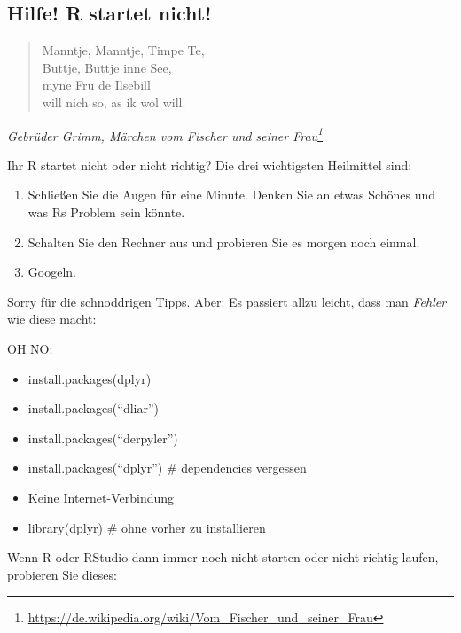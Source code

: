 \documentclass[12pt,ngerman,]{book}
\providecommand{\tightlist}{%
  \setlength{\itemsep}{0pt}\setlength{\parskip}{0pt}}
\let\rmarkdownfootnote\footnote%
\def\footnote{\protect\rmarkdownfootnote}
\theoremstyle{definition}
\theoremstyle{definition}
\theoremstyle{remark}
\let\BeginKnitrBlock\begin \let\EndKnitrBlock\end
\begin{document}
\subsection{Hilfe! R startet nicht!}\label{hilfe-r-startet-nicht}

\begin{quote}
Manntje, Manntje, Timpe Te,\\
Buttje, Buttje inne See,\\
myne Fru de Ilsebill\\
will nich so, as ik wol will.
\end{quote}

\emph{Gebrüder Grimm, Märchen vom Fischer und seiner Frau\footnote{\url{https://de.wikipedia.org/wiki/Vom_Fischer_und_seiner_Frau}}}

Ihr R startet nicht oder nicht richtig? Die drei wichtigsten Heilmittel
sind:

\begin{enumerate}
\def\labelenumi{\arabic{enumi}.}
\tightlist
\item
  Schließen Sie die Augen für eine Minute. Denken Sie an etwas Schönes
  und was Rs Problem sein könnte.
\item
  Schalten Sie den Rechner aus und probieren Sie es morgen noch einmal.
\item
  Googeln.
\end{enumerate}

Sorry für die schnoddrigen Tipps. Aber: Es passiert allzu leicht, dass
man \emph{Fehler} wie diese macht:

\BeginKnitrBlock{rmdcaution}
OH NO:

\begin{itemize}
\item
  install.packages(dplyr)
\item
  install.packages(``dliar'')
\item
  install.packages(``derpyler'')
\item
  install.packages(``dplyr'') \# dependencies vergessen
\item
  Keine Internet-Verbindung
\item
  library(dplyr) \# ohne vorher zu installieren
\end{itemize}
\EndKnitrBlock{rmdcaution}

Wenn R oder RStudio dann immer noch nicht starten oder nicht richtig
laufen, probieren Sie dieses:
\end{document}
